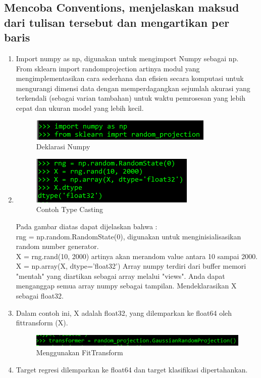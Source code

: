 \subsection{Mencoba Conventions, menjelaskan maksud dari tulisan tersebut dan mengartikan per baris}
\begin{enumerate}
\item
Import numpy as np, digunakan untuk mengimport Numpy sebagai np.\\
From sklearn import randomprojection artinya modul yang mengimplementasikan cara sederhana dan efisien secara komputasi untuk mengurangi dimensi data dengan memperdagangkan sejumlah akurasi yang terkendali (sebagai varian tambahan) untuk waktu pemrosesan yang lebih cepat dan ukuran model yang lebih kecil.
\begin{figure}
	\begin{center}
   	 \includegraphics[scale=1]{figures/aip12.png}
   	 \caption{Deklarasi Numpy}	
	\end{center}
\end{figure}
\item
\begin{figure}
	\begin{center}
   	 \includegraphics[scale=1]{figures/aip13.png}
   	 \caption{Contoh Type Casting}	
	\end{center}
\end{figure}
Pada gambar diatas dapat dijelaskan bahwa :\\
rng = np.random.RandomState(0), digunakan untuk menginisialisasikan random number generator.\\
X = rng.rand(10, 2000) artinya akan merandom value antara 10 sampai 2000.\\
X = np.array(X, dtype='float32') Array numpy terdiri dari buffer memori "mentah" yang diartikan sebagai array melalui "views". Anda dapat menganggap semua array numpy sebagai tampilan. Mendeklarasikan X sebagai float32.
\item
Dalam contoh ini, X adalah float32, yang dilemparkan ke float64 oleh fittransform (X).
\begin{figure}
	\begin{center}
   	 \includegraphics[scale=1]{figures/aip14.png}
   	 \caption{Menggunakan FitTransform}
	\end{center}
\end{figure}
\item
Target regresi dilemparkan ke float64 dan target klasifikasi dipertahankan.


\end{enumerate}
